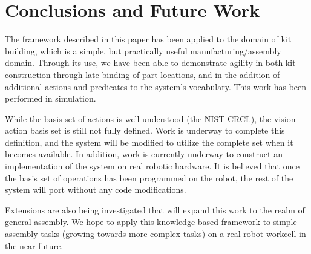 \section{Conclusions and Future Work}
\label{sect:future}
The framework described in this paper has been applied to the domain of kit building, which is a simple, but practically useful manufacturing/assembly domain. Through its use, we have been able to demonstrate agility in both kit construction through late binding of part locations, and in the addition of additional actions and predicates to the system's vocabulary. This work has been performed in simulation.

While the basis set of actions is well understood (the NIST CRCL), the
vision action basis set is still not fully defined. Work is underway
to complete this definition, and the system will be modified to 
utilize the complete set when it becomes available. In addition,
work is currently underway to construct an implementation of the system on real robotic hardware. It is believed that once the basis set of operations has been programmed on the robot, the rest of the system will port without any code modifications. 

Extensions are also being investigated that will expand this work to the realm of general assembly. We hope to apply this knowledge based framework to simple assembly tasks (growing towards more complex tasks) on a real robot workcell in the near future. 
